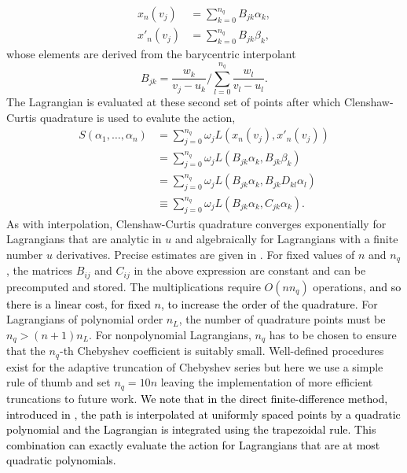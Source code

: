 \begin{align}
x_{n}(v_{j}) & =\sum_{k=0}^{n_{q}}B_{jk}\alpha_{k},\\
x'_{n}(v_{j}) & =\sum_{k=0}^{n_{q}}B_{jk}\beta_{k},
\end{align}
whose elements are derived from the barycentric interpolant
\begin{equation}
B_{jk}=\frac{w_{k}}{v_{j}-u_{k}}\bigg/\sum_{l=0}^{n_{q}}\frac{w_{l}}{v_{l}-u_{l}}.
\end{equation}
The Lagrangian is evaluated at these second set of points after which
Clenshaw-Curtis quadrature \citep{trefethen2000spectral,boyd2001chebyshev}
is used to evalute the action,
\begin{align}
S(\alpha_{1},\ldots,\alpha_{n}) & =\sum_{j=0}^{n_{q}}\omega_{j}L(x_{n}(v_{j}),x'_{n}(v_{j}))\label{eq:quadrature-formula}\\
 & =\sum_{j=0}^{n_{q}}\omega_{j}L(B_{jk}\alpha_{k},B_{jk}\beta_{k})\nonumber \\
 & =\sum_{j=0}^{n_{q}}\omega_{j}L(B_{jk}\alpha_{k},B_{jk}D_{kl}\alpha_{l})\nonumber \\
 & \equiv\sum_{j=0}^{n_{q}}\omega_{j}L(B_{jk}\alpha_{k},C_{jk}\alpha_{k}).\nonumber 
\end{align}
As with interpolation, Clenshaw-Curtis quadrature converges exponentially
for Lagrangians that are analytic in $u$ and algebraically for Lagrangians
with a finite number $u$ derivatives. Precise estimates are given
in \citep{trefethen2013approximation}. For fixed values of $n$ and
$n_{q}$, the matrices $B_{ij}$ and $C_{ij}$ in the above expression
are constant and can be precomputed and stored. The multiplications
require $O(nn_{q})$ operations, \textcolor{black}{and so there is
a linear cost, for fixed $n$, to increase the order of the quadrature.}
For Lagrangians of polynomial order $n_{L}$, the number of quadrature
points must be $n_{q}>(n+1)n_{L}.$ For nonpolynomial Lagrangians,
$n_{q}$ has to be chosen to ensure that the $n_{q}$-th Chebyshev
coefficient is suitably small. Well-defined procedures exist for the
adaptive truncation of Chebyshev series \citep{aurentz2017chopping}
but here we use a simple rule of thumb and set $n_{q}=10n$ leaving
the implementation of more efficient truncations to future work. \textcolor{black}{We
note that in the direct finite-difference method, introduced in \citep{eMinimumActionMethod2004a},
the path is interpolated at uniformly spaced points by a quadratic
polynomial and the Lagrangian is integrated using the trapezoidal
rule. This combination can exactly evaluate the action for Lagrangians
that are at most quadratic polynomials.} %
